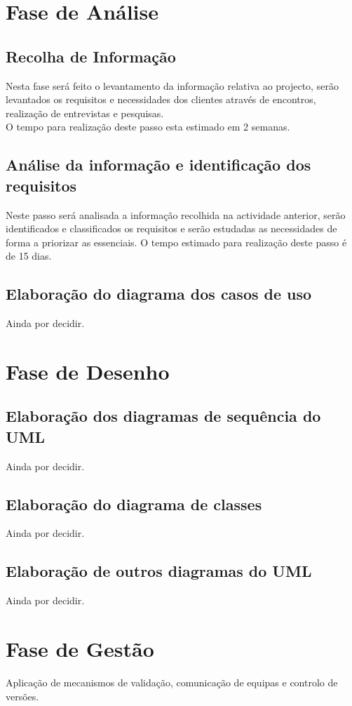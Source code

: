 \documentclass[a4paper]{article}
\begin{document}
\section{Fase de Análise}
\subsection{Recolha de Informação}
 Nesta fase será feito o levantamento da informação relativa ao projecto, serão levantados os requisitos e necessidades dos clientes através de encontros, realização de entrevistas e pesquisas.\\
O tempo para realização deste passo esta estimado em 2 semanas. 
    
\subsection{Análise da informação e identificação dos requisitos}
Neste passo será analisada a informação recolhida na actividade anterior, serão identificados e classificados os requisitos e serão estudadas as necessidades de forma a priorizar as essenciais.
O tempo estimado para realização deste passo é de 15 dias.

\subsection{Elaboração do diagrama dos casos de uso}
Ainda por decidir.

\section{Fase de Desenho}
\subsection{Elaboração dos diagramas de sequência do UML}
Ainda por decidir.
\subsection{Elaboração do diagrama de classes}
Ainda por decidir.
\subsection{Elaboração de outros diagramas do UML}
Ainda por decidir.

\section{Fase de Gestão}
Aplicação de mecanismos de validação, comunicação de equipas e
controlo de versões.
\end{document}
